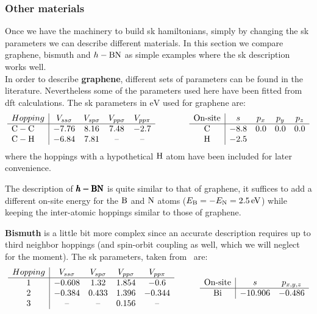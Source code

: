 \subsubsection{Other materials}
Once we have the machinery to build \ac{sk} hamiltonians, simply by changing the \ac{sk} parameters we can describe different materials.
In this section we compare graphene, bismuth and $h-\ce{BN}$  %
as simple examples where the \ac{sk} description works well.\\

%
%
In order to describe \textbf{graphene}, different sets of parameters can be found in the literature\cite{Gosalbez-Martinez2011, Konschuh2010, Saito1998}. Nevertheless some of the parameters used here have been fitted from \ac{dft} calculations. The \ac{sk} parameters in $\si{\eV}$ used for graphene are:
\begin{equation}
  \begin{array}{l|cccc}
    Hopping & V_{ss\sigma} & V_{sp\sigma} & V_{pp\sigma} & V_{pp\pi} \\ \hline
    \ce{C}-\ce{C} & -7.76 & 8.16 & 7.48 & -2.7 \\
    \ce{C}-\ce{H} & -6.84 & 7.81 & \text{--} & \text{--}
  \end{array}\qquad\qquad
  \begin{array}{c|cccc}
    \text{On-site} & s & p_x & p_y & p_z \\ \hline
    \ce{C} & -8.8 & 0.0 & 0.0 & 0.0 \\
    \ce{H} & -2.5 &     &     &
  \end{array}
\label{G_SK_params}
\end{equation}
where the hoppings with a hypothetical $\ce{H}$ atom have been included for later convenience.
\medbreak

The description of $\pmb{h-\ce{BN}}$ is quite similar to that of graphene, it suffices to add a different on-site energy for the $\ce{B}$ and $\ce{N}$ atoms ($E_{\ce{B}} = -E_{\ce{N}} =\SI{2.5}{\eV}$) while keeping the inter-atomic hoppings similar to those of graphene.
\medbreak

\textbf{Bismuth} is a little bit more complex since an accurate description requires up to third neighbor hoppings (and spin-orbit coupling as well, which we will neglect for the moment). The \ac{sk} parameters, taken from~ are:
\begin{equation}
  \begin{array}{c|cccc}
    Hopping & V_{ss\sigma} & V_{sp\sigma} & V_{pp\sigma} & V_{pp\pi} \\ \hline
    1 & -0.608 & 1.32 & 1.854 & -0.6 \\
    2 & -0.384 & 0.433 & 1.396 & -0.344 \\
    3 & \text{--} & \text{--} & 0.156 & \text{--}
  \end{array}\quad\qquad
  \begin{array}{c|cc}
     \text{On-site} & s & p_{x,y,z} \\ \hline
    \ce{Bi} & -10.906 & -0.486
  \end{array}
\label{Bi_SK_params}
\end{equation}
\medbreak

